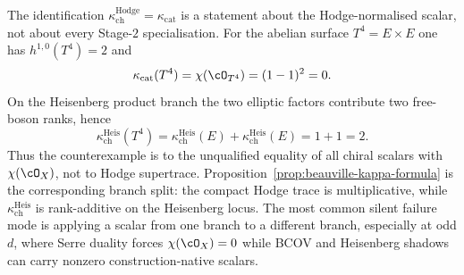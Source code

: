 \begin{remark}[Hypothesis \texorpdfstring{$h^{1,0} = 0$}{h-1,0 = 0} is essential at \texorpdfstring{$d = 2$}{d = 2}]
\label{rem:cy-d-d2-hypothesis}
The identification $\kappa_{\mathrm{ch}}^{\mathrm{Hodge}} = \kappa_{\mathrm{cat}}$ is a statement about the Hodge-normalised scalar, not about every Stage-$2$ specialisation. For the abelian surface $T^4 = E \times E$ one has $h^{1,0}(T^4)=2$ and
\[
 \kappa_{\mathrm{cat}}(T^4)=\chi(\cO_{T^4})=(1-1)^2=0.
\]
On the Heisenberg product branch the two elliptic factors contribute two free-boson ranks, hence
\[
 \kappa_{\mathrm{ch}}^{\mathrm{Heis}}(T^4)
 = \kappa_{\mathrm{ch}}^{\mathrm{Heis}}(E)
 + \kappa_{\mathrm{ch}}^{\mathrm{Heis}}(E)
 = 1+1=2.
\]
Thus the counterexample is to the unqualified equality of all chiral scalars with $\chi(\cO_X)$, not to Hodge supertrace. Proposition~\textup{\ref{prop:beauville-kappa-formula}} is the corresponding branch split: the compact Hodge trace is multiplicative, while $\kappa_{\mathrm{ch}}^{\mathrm{Heis}}$ is rank-additive on the Heisenberg locus. The most common silent failure mode is applying a scalar from one branch to a different branch, especially at odd $d$, where Serre duality forces $\chi(\cO_X)=0$ while BCOV and Heisenberg shadows can carry nonzero construction-native scalars.
\end{remark}

